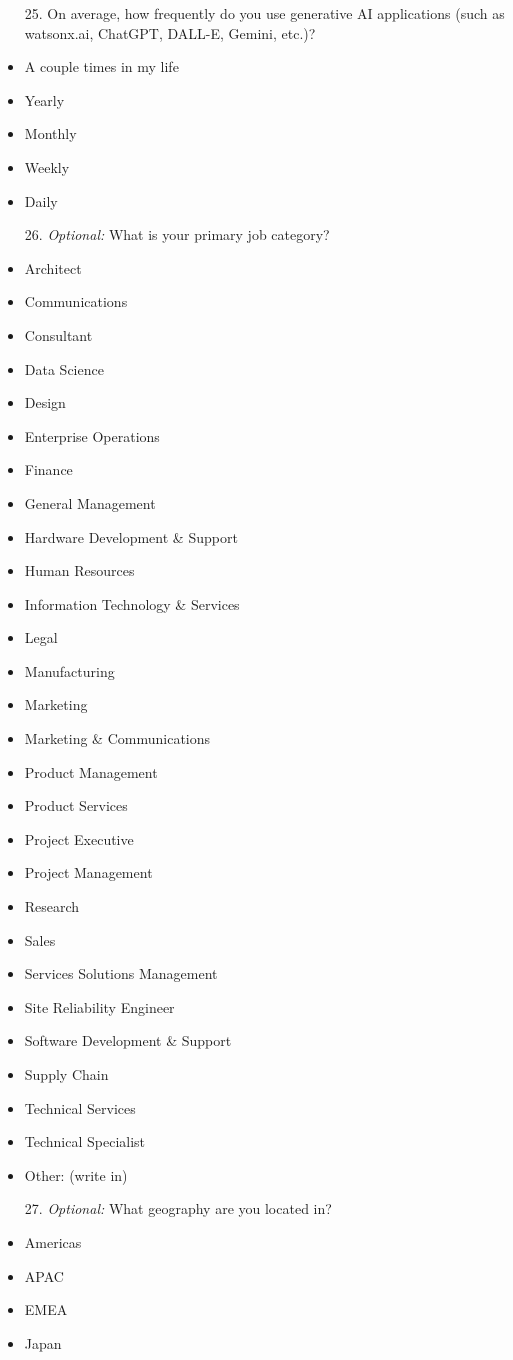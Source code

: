 \begin{itemize}[leftmargin=0pt, itemindent=2em]
    \item[25.] On average, how frequently do you use generative AI applications (such as watsonx.ai, ChatGPT, DALL-E, Gemini, etc.)?
    \item A couple times in my life
    \item Yearly
    \item Monthly
    \item Weekly
    \item Daily
\end{itemize}

\begin{itemize}[leftmargin=0pt, itemindent=2em]
    \item[26.] \textit{Optional:} What is your primary job category?
    \item Architect
    \item Communications
    \item Consultant
    \item Data Science
    \item Design
    \item Enterprise Operations
    \item Finance
    \item General Management
    \item Hardware Development \& Support
    \item Human Resources
    \item Information Technology \& Services
    \item Legal
    \item Manufacturing
    \item Marketing
    \item Marketing \& Communications
    \item Product Management
    \item Product Services
    \item Project Executive
    \item Project Management
    \item Research
    \item Sales
    \item Services Solutions Management
    \item Site Reliability Engineer
    \item Software Development \& Support
    \item Supply Chain
    \item Technical Services
    \item Technical Specialist
    \item Other: (write in)
\end{itemize}

\begin{itemize}[leftmargin=0pt, itemindent=2em]
    \item[27.] \textit{Optional:} What geography are you located in?
    \item Americas
    \item APAC
    \item EMEA
    \item Japan
\end{itemize}
